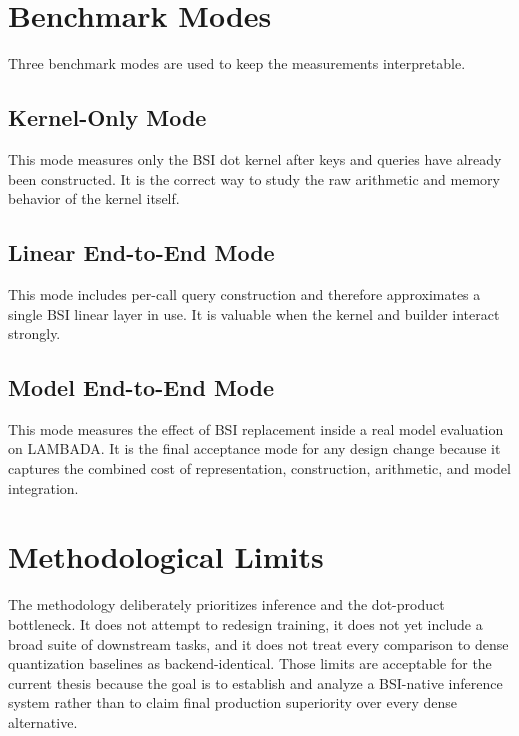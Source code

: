 \section{Benchmark Modes}
Three benchmark modes are used to keep the measurements interpretable.

\subsection{Kernel-Only Mode}
This mode measures only the BSI dot kernel after keys and queries have already been constructed. It is the correct way to study the raw arithmetic and memory behavior of the kernel itself.

\subsection{Linear End-to-End Mode}
This mode includes per-call query construction and therefore approximates a single BSI linear layer in use. It is valuable when the kernel and builder interact strongly.

\subsection{Model End-to-End Mode}
This mode measures the effect of BSI replacement inside a real model evaluation on LAMBADA. It is the final acceptance mode for any design change because it captures the combined cost of representation, construction, arithmetic, and model integration.

\section{Methodological Limits}
The methodology deliberately prioritizes inference and the dot-product bottleneck. It does not attempt to redesign training, it does not yet include a broad suite of downstream tasks, and it does not treat every comparison to dense quantization baselines as backend-identical. Those limits are acceptable for the current thesis because the goal is to establish and analyze a BSI-native inference system rather than to claim final production superiority over every dense alternative.
